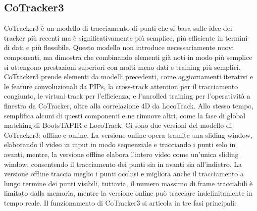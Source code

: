 \subsection{CoTracker3}
CoTracker3 è un modello di tracciamento di punti che si basa sulle idee dei tracker più recenti ma è significativamente più semplice, più efficiente in termini di dati e più flessibile. Questo modello non introduce necessariamente nuovi componenti, ma dimostra che combinando elementi già noti in modo più semplice si ottengono prestazioni superiori con molti meno dati e training più semplici. CoTracker3 prende elementi da modelli precedenti, come aggiornamenti iterativi e le feature convoluzionali da PIPs, la cross-track attention per il tracciamento congiunto, le virtual track per l'efficienza, e l'unrolled training per l'operatività a finestra da CoTracker, oltre alla correlazione 4D da LocoTrack. Allo stesso tempo, semplifica alcuni di questi componenti e ne rimuove altri, come la fase di global matching di BootsTAPIR e LocoTrack. Ci sono due versioni del modello di CoTracker3: offline e online. La versione online opera tramite una sliding window, elaborando il video in input in modo sequenziale e tracciando i punti solo in avanti, mentre, la versione offline elabora l'intero video come un'unica sliding window, consentendo il tracciamento dei punti sia in avanti sia all'indietro. La versione offline traccia meglio i punti occlusi e migliora anche il tracciamento a lungo termine dei punti visibili, tuttavia, il numero massimo di frame tracciabili è limitato dalla memoria, mentre la versione online può tracciare indefinitamente in tempo reale.
Il funzionamento di CoTracker3 si articola in tre fasi principali:
